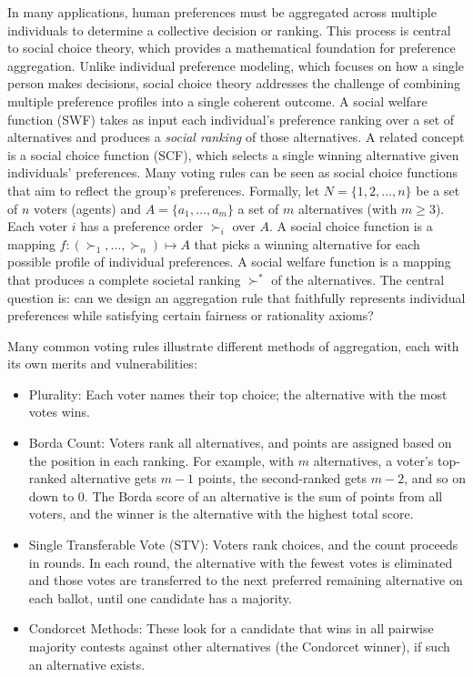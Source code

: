 \documentclass[
  letterpaper,
  numbers=noenddot,
  DIV=11]{scrreprt}
\providecommand{\tightlist}{%
  \setlength{\itemsep}{0pt}\setlength{\parskip}{0pt}}\usepackage{longtable,booktabs,array}
\theoremstyle{definition}
\theoremstyle{plain}
\theoremstyle{plain}
\theoremstyle{remark}
\begin{document}
In many applications, human preferences must be aggregated across
multiple individuals to determine a collective decision or ranking. This
process is central to social choice theory, which provides a
mathematical foundation for preference aggregation. Unlike individual
preference modeling, which focuses on how a single person makes
decisions, social choice theory addresses the challenge of combining
multiple preference profiles into a single coherent outcome. A social
welfare function (SWF) takes as input each individual's preference
ranking over a set of alternatives and produces a \emph{social ranking}
of those alternatives. A related concept is a social choice function
(SCF), which selects a single winning alternative given individuals'
preferences. Many voting rules can be seen as social choice functions
that aim to reflect the group's preferences. Formally, let
\(N=\{1,2,\dots,n\}\) be a set of \(n\) voters (agents) and
\(A=\{a_1,\dots,a_m\}\) a set of \(m\) alternatives (with \(m \ge 3\)).
Each voter \(i\) has a preference order \(\succ_i\) over \(A\). A social
choice function is a mapping \(f: (\succ_1,\dots,\succ_n)\mapsto A\)
that picks a winning alternative for each possible profile of individual
preferences. A social welfare function is a mapping that produces a
complete societal ranking \(\succ^*\) of the alternatives. The central
question is: can we design an aggregation rule that faithfully
represents individual preferences while satisfying certain fairness or
rationality axioms?

Many common voting rules illustrate different methods of aggregation,
each with its own merits and vulnerabilities:

\begin{itemize}
\tightlist
\item
  Plurality: Each voter names their top choice; the alternative with the
  most votes wins.
\item
  Borda Count: Voters rank all alternatives, and points are assigned
  based on the position in each ranking. For example, with \(m\)
  alternatives, a voter's top-ranked alternative gets \(m-1\) points,
  the second-ranked gets \(m-2\), and so on down to 0. The Borda score
  of an alternative is the sum of points from all voters, and the winner
  is the alternative with the highest total score.
\item
  Single Transferable Vote (STV): Voters rank choices, and the count
  proceeds in rounds. In each round, the alternative with the fewest
  votes is eliminated and those votes are transferred to the next
  preferred remaining alternative on each ballot, until one candidate
  has a majority.
\item
  Condorcet Methods: These look for a candidate that wins in all
  pairwise majority contests against other alternatives (the Condorcet
  winner), if such an alternative exists.
\end{itemize}
\end{document}
